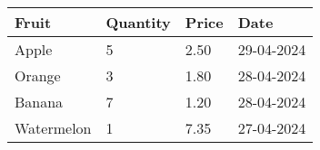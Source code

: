 \begin{tabular}{| l | l | l | l |}
	\hline	\textbf{Fruit} & \textbf{Quantity} & \textbf{Price} & \textbf{Date} \\ 
	\hline
	Apple & 5 & 2.50 & 29-04-2024 \\ 
	\hline
	Orange & 3 & 1.80 & 28-04-2024 \\ 
	\hline
	Banana & 7 & 1.20 & 28-04-2024 \\ 
	\hline
	Watermelon & 1 & 7.35 & 27-04-2024 \\ 
	\hline
\end{tabular}
